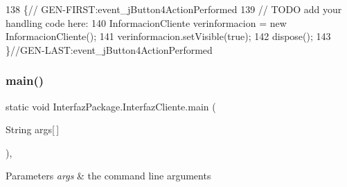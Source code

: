\begin{DoxyCode}
138                                                                          \{\textcolor{comment}{//
      GEN-FIRST:event\_jButton4ActionPerformed}
139         \textcolor{comment}{// TODO add your handling code here:}
140         InformacionCliente verinformacion = \textcolor{keyword}{new} InformacionCliente();
141         verinformacion.setVisible(\textcolor{keyword}{true});
142         dispose();
143     \}\textcolor{comment}{//GEN-LAST:event\_jButton4ActionPerformed}
\end{DoxyCode}
\mbox{\label{class_interfaz_package_1_1_interfaz_cliente_ac31582969c3d4036dd821f14fe9fae9f}} 
\subsubsection{\texorpdfstring{main()}{main()}}
{\footnotesize\ttfamily static void Interfaz\+Package.\+Interfaz\+Cliente.\+main (\begin{DoxyParamCaption}\item[{String}]{args\mbox{[}$\,$\mbox{]} }\end{DoxyParamCaption})\hspace{0.3cm}{\ttfamily [inline]}, {\ttfamily [static]}}


\begin{DoxyParams}{Parameters}
{\em args} & the command line arguments \\
\hline
\end{DoxyParams}

